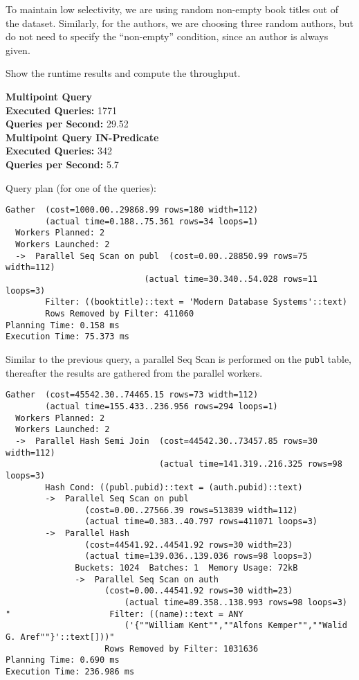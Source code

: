 \documentclass[11pt]{scrartcl}
\begin{document}
To maintain low selectivity, we are using random non-empty book titles out of the dataset.
Similarly, for the authors, we are choosing three random authors, but do not need to specify the \enquote{non-empty}
condition, since an author is always given.

Show the runtime results and compute the throughput.

\textbf{Multipoint Query}\\
\textbf{Executed Queries: } 1771\\
\textbf{Queries per Second: } 29.52\\

\textbf{Multipoint Query IN-Predicate}\\
\textbf{Executed Queries: } 342\\
\textbf{Queries per Second: } 5.7

Query plan (for one of the queries):

{\small
\parskip0pt\begin{verbatim}
Gather  (cost=1000.00..29868.99 rows=180 width=112)
        (actual time=0.188..75.361 rows=34 loops=1)
  Workers Planned: 2
  Workers Launched: 2
  ->  Parallel Seq Scan on publ  (cost=0.00..28850.99 rows=75 width=112)
                            (actual time=30.340..54.028 rows=11 loops=3)
        Filter: ((booktitle)::text = 'Modern Database Systems'::text)
        Rows Removed by Filter: 411060
Planning Time: 0.158 ms
Execution Time: 75.373 ms
\end{verbatim}}

Similar to the previous query, a parallel Seq Scan is performed on the \texttt{publ} table, thereafter the results are
gathered from the parallel workers.


{\small
\parskip0pt\begin{verbatim}
Gather  (cost=45542.30..74465.15 rows=73 width=112)
        (actual time=155.433..236.956 rows=294 loops=1)
  Workers Planned: 2
  Workers Launched: 2
  ->  Parallel Hash Semi Join  (cost=44542.30..73457.85 rows=30 width=112)
                               (actual time=141.319..216.325 rows=98 loops=3)
        Hash Cond: ((publ.pubid)::text = (auth.pubid)::text)
        ->  Parallel Seq Scan on publ
                (cost=0.00..27566.39 rows=513839 width=112)
                (actual time=0.383..40.797 rows=411071 loops=3)
        ->  Parallel Hash
                (cost=44541.92..44541.92 rows=30 width=23)
                (actual time=139.036..139.036 rows=98 loops=3)
              Buckets: 1024  Batches: 1  Memory Usage: 72kB
              ->  Parallel Seq Scan on auth
                    (cost=0.00..44541.92 rows=30 width=23)
                        (actual time=89.358..138.993 rows=98 loops=3)
"                    Filter: ((name)::text = ANY
                        ('{""William Kent"",""Alfons Kemper"",""Walid G. Aref""}'::text[]))"
                    Rows Removed by Filter: 1031636
Planning Time: 0.690 ms
Execution Time: 236.986 ms
\end{verbatim}}
\end{document}
